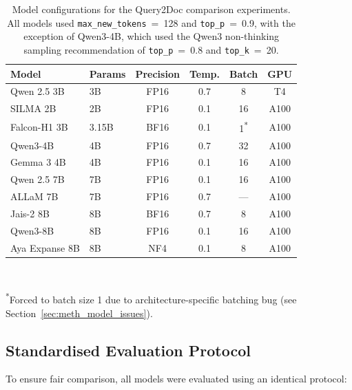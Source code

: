 \begin{table}[htbp]
    \centering
    \caption[Model configurations for the Query2Doc comparison]{Model configurations for the Query2Doc comparison experiments. All models used \texttt{max\_new\_tokens}~=~128 and \texttt{top\_p}~=~0.9, with the exception of Qwen3-4B, which used the Qwen3 non-thinking sampling recommendation of \texttt{top\_p}~=~0.8 and \texttt{top\_k}~=~20.}
    \label{tab:model_configs}
    \begin{tabular}{@{}llcccc@{}}
        \toprule
        \textbf{Model} & \textbf{Params} & \textbf{Precision} & \textbf{Temp.} & \textbf{Batch} & \textbf{GPU} \\
        \midrule
        Qwen 2.5 3B & 3B & FP16 & 0.7 & 8 & T4 \\
        SILMA 2B & 2B & FP16 & 0.1 & 16 & A100 \\
        Falcon-H1 3B & 3.15B & BF16 & 0.1 & 1\textsuperscript{*} & A100 \\
        Qwen3-4B & 4B & FP16 & 0.7 & 32 & A100 \\
        Gemma 3 4B & 4B & FP16 & 0.1 & 16 & A100 \\
        Qwen 2.5 7B & 7B & FP16 & 0.1 & 16 & A100 \\
        ALLaM 7B & 7B & FP16 & 0.7 & --- & A100 \\
        Jais-2 8B & 8B & BF16 & 0.7 & 8 & A100 \\
        Qwen3-8B & 8B & FP16 & 0.1 & 16 & A100 \\
        Aya Expanse 8B & 8B & NF4 & 0.1 & 8 & A100 \\
        \bottomrule
    \end{tabular}
    \\[0.5em]
    \raggedright\small\textsuperscript{*}Forced to batch size 1 due to architecture-specific batching bug (see Section~\ref{sec:meth_model_issues}).
\end{table}

\subsection{Standardised Evaluation Protocol}
\label{sec:meth_model_protocol}

To ensure fair comparison, all models were evaluated using an identical protocol:

